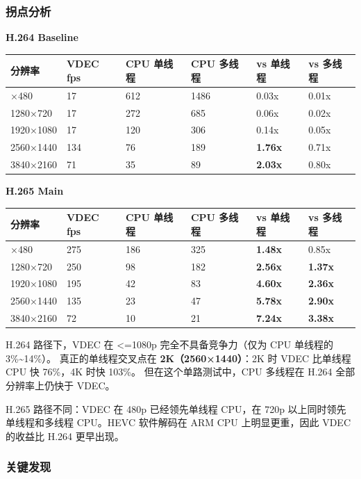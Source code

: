 \subsubsection{拐点分析}\label{src-book-chapter6-h78}

\textbf{H.264 Baseline}

\begin{longtable}[]{@{}llllll@{}}
\toprule\noalign{}
分辨率 & VDEC fps & CPU 单线程 & CPU 多线程 & vs 单线程 & vs 多线程 \\
\midrule\noalign{}
\endhead
\bottomrule\noalign{}
\endlastfoot
640×480 & 17 & 612 & 1486 & 0.03x & 0.01x \\
1280×720 & 17 & 272 & 685 & 0.06x & 0.02x \\
1920×1080 & 17 & 120 & 306 & 0.14x & 0.05x \\
2560×1440 & 134 & 76 & 189 & \textbf{1.76x} & 0.71x \\
3840×2160 & 71 & 35 & 89 & \textbf{2.03x} & 0.80x \\
\end{longtable}

\textbf{H.265 Main}

\begin{longtable}[]{@{}llllll@{}}
\toprule\noalign{}
分辨率 & VDEC fps & CPU 单线程 & CPU 多线程 & vs 单线程 & vs 多线程 \\
\midrule\noalign{}
\endhead
\bottomrule\noalign{}
\endlastfoot
640×480 & 275 & 186 & 325 & \textbf{1.48x} & 0.85x \\
1280×720 & 250 & 98 & 182 & \textbf{2.56x} & \textbf{1.37x} \\
1920×1080 & 195 & 42 & 83 & \textbf{4.60x} & \textbf{2.36x} \\
2560×1440 & 135 & 23 & 47 & \textbf{5.78x} & \textbf{2.90x} \\
3840×2160 & 72 & 10 & 21 & \textbf{7.24x} & \textbf{3.38x} \\
\end{longtable}

H.264 路径下，VDEC 在 \textless=1080p 完全不具备竞争力（仅为 CPU
单线程的 3\%\textasciitilde14\%）。 真正的单线程交叉点在
\textbf{2K（2560×1440）}：2K 时 VDEC 比单线程 CPU 快 76\%，4K 时快
103\%。 但在这个单路测试中，CPU 多线程在 H.264 全部分辨率上仍快于 VDEC。

H.265 路径不同：VDEC 在 480p 已经领先单线程 CPU，在 720p
以上同时领先单线程和多线程 CPU。HEVC 软件解码在 ARM CPU 上明显更重，因此
VDEC 的收益比 H.264 更早出现。

\subsubsection{关键发现}\label{src-book-chapter6-h79}


